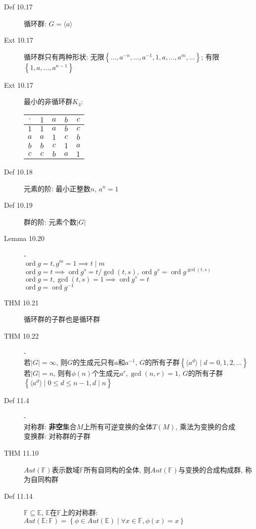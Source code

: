 \documentclass{article}
\renewcommand{\l}{\left}
\renewcommand{\r}{\right}
\newcommand{\ord}{\operatorname{ord}}
\begin{document}
\begin{description}
        \item[Def 10.17] 循环群: $G = \langle a \rangle$
        \item[Ext 10.17] 循环群只有两种形状: 无限$\l\{ \dots, a^{-n}, \dots, a^{-1}, 1, a, \dots, a^m, \dots \r\}$; 有限$\l\{ 1, a, \dots, a^{n-1} \r\}$
        \item[Ext 10.17] 最小的非循环群$K_4$:
            \begin{tabular}{c|cccc}
                $\cdot$ & $1$ & $a$ & $b$ & $c$\\
                \hline
                $1$ & $1$ & $a$ & $b$ & $c$\\
                $a$ & $a$ & $1$ & $c$ & $b$\\
                $b$ & $b$ & $c$ & $1$ & $a$\\
                $c$ & $c$ & $b$ & $a$ & $1$
            \end{tabular}
        \item[Def 10.18] 元素的阶: 最小正整数$n$, $a^n = 1$
        \item[Def 10.19] 群的阶: 元素个数$|G|$
        \item[Lemma 10.20] -\\$\ord g = t, g^m = 1 \implies t \mid m$\\
            $\ord g = t \implies \ord g^s = t / \gcd(t, s), \ord g^s = \ord g^{\gcd(t, s)}$\\
            $\ord g = t, \gcd(t, s) = 1 \implies \ord g^s = t$\\
            $\ord g = \ord g^{-1}$
        \item[THM 10.21] 循环群的子群也是循环群
        \item[THM 10.22] -\\若$\l| G \r| = \infty$, 则$G$的生成元只有$a$和$a^{-1}$, $G$的所有子群$\l\{ \langle a^d \rangle \mid d = 0, 1, 2, \dots \r\}$\\
            若$\l|G\r| = n$, 则有$\phi(n)$个生成元$a^r, \gcd(n, r) = 1$, $G$的所有子群$\l\{ \langle a^d \rangle \mid 0 \le d \le n - 1, d \mid n \r\}$
        \item[Def 11.4] -\\对称群: \textbf{非空}集合$M$上所有可逆变换的全体$T(M)$, 乘法为变换的合成\\
            变换群: 对称群的子群
        \item[THM 11.10] $Aut(\mathbb F)$表示数域$\mathbb F$所有自同构的全体, 则$Aut(\mathbb F)$与变换的合成构成群, 称为自同构群
        \item[Def 11.14] $\mathbb F \subseteq \mathbb E$, $\mathbb E$在$\mathbb F$上的对称群: $Aut(\mathbb E : \mathbb F) = \l\{ \phi \in Aut(\mathbb E) \mid \forall x \in \mathbb F, \phi(x) = x \r\}$

\end{description}
\end{document}
